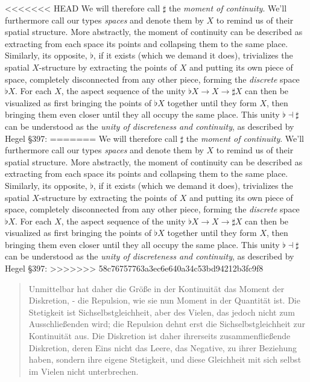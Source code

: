 \documentclass{article}
\begin{document}
<<<<<<< HEAD
We will therefore call $\sharp$ the \emph{moment of continuity}. We'll furthermore call our types 
\emph{spaces} and denote them by $X$ to remind us of their spatial structure. More abstractly, the moment of 
continuity can be described as extracting from each space its points and collapsing them to the same place. 
Similarly, its opposite, $\flat$, if it exists (which we demand it does), trivializes the spatial 
$X$-structure by extracting the points of $X$ and putting its own piece of space, completely disconnected 
from any other piece, forming the \emph{discrete} space $\flat X$. For each $X$, the aspect sequence of the 
unity $\flat X \rightarrow X \rightarrow \sharp X$ can then be visualized as first bringing the points of 
$\flat X$ together until they form $X$, then bringing them even closer until they all occupy the same place. 
This unity $\flat\dashv\sharp$ can be understood as the \emph{unity of discreteness and continuity}, as 
described by Hegel §397:
=======
We will therefore call $\sharp$ the \emph{moment of continuity}. We'll furthermore call our types \emph{spaces}
and denote them by $X$ to remind us of their spatial structure. More abstractly, the moment of continuity
can be described as extracting from each space its points and collapsing them to the same place. Similarly,
its opposite, $\flat$, if it exists (which we demand it does), trivializes the spatial $X$-structure by
extracting the points of $X$ and putting its own piece of space, completely disconnected from any other
piece, forming the \emph{discrete} space $\flat X$. For each $X$, the aspect sequence of the unity $\flat
X \rightarrow X \rightarrow \sharp X$ can then be visualized as first bringing the points of $\flat X$
together until they form $X$, then bringing them even closer until they all occupy the same place. This
unity $\flat\dashv\sharp$ can be understood as the \emph{unity of discreteness and continuity}, as described
by Hegel §397:
>>>>>>> 58c76757763a3ec6e640a34c53bd94212b3fc9f8

\begin{quote}
    Unmittelbar hat daher die Größe in der Kontinuität das Moment der Diskretion, - die Repulsion, wie
sie nun Moment in der Quantität ist. Die Stetigkeit ist Sichselbstgleichheit, aber des Vielen, das jedoch
nicht zum Ausschließenden wird; die Repulsion dehnt erst die Sichselbstgleichheit zur Kontinuität aus.
Die Diskretion ist daher ihrerseits zusammenfließende Diskretion, deren Eins nicht das Leere, das Negative,
zu ihrer Beziehung haben, sondern ihre eigene Stetigkeit, und diese Gleichheit mit sich selbst im Vielen
nicht unterbrechen.
\end{quote}
\end{document}
